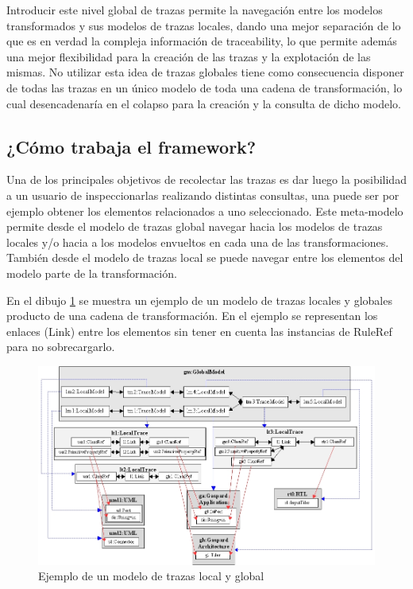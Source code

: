 \documentclass[a4paper,12pt,oneside]{book}
\begin{document}
Introducir este nivel global de trazas permite la navegación entre los modelos transformados y sus modelos de trazas locales, dando una mejor separación de lo que es en verdad la compleja información de traceability, lo que permite además una mejor flexibilidad para la creación de las trazas y la explotación de las mismas. No utilizar esta idea de trazas globales tiene como consecuencia disponer de todas las trazas en un único modelo de toda una cadena de transformación, lo cual desencadenaría en el colapso para la creación y la consulta de dicho modelo.

\subsection{¿Cómo trabaja el framework?}

Una de los principales objetivos de recolectar las trazas es dar luego la posibilidad a un usuario de inspeccionarlas realizando distintas consultas, una puede ser por ejemplo obtener los elementos relacionados a uno seleccionado. Este meta-modelo permite desde el modelo de trazas global navegar hacia los modelos de trazas locales y/o hacia a los modelos envueltos en cada una de las transformaciones. También desde el modelo de trazas local se puede navegar entre los elementos del modelo parte de la transformación.

En el dibujo \ref{fig:EjemploLocalGlobalMetamodel} se muestra un ejemplo de un modelo de trazas locales y globales producto de una cadena de transformación. En el ejemplo se representan los enlaces (Link) entre los elementos sin tener en cuenta las instancias de RuleRef para no sobrecargarlo.

\begin{figure}[hbtp]
\centering
\includegraphics[scale=.45]{./img/EjemploLocalGlobalMetamodel}
\caption{Ejemplo de un modelo de trazas local y global}
\label{fig:EjemploLocalGlobalMetamodel}
\end{figure}
\end{document}
